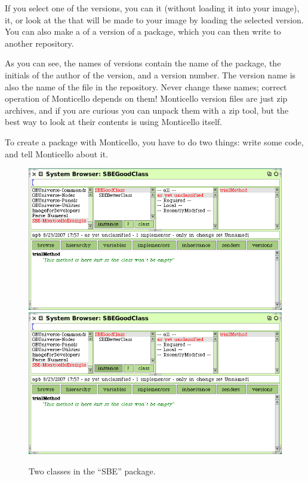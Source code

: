 \documentclass[a4paper,10pt,twoside]{book}
\begin{document}
If you select one of the versions, you can  it (without loading it into your image),  it, or look at the  that will be made to your image by loading the selected version.  You can also make a  of a version of a package, which you can then write to another repository.

As you can see, the names of versions contain the name of the package, the initials of the author of the version, and a version number.  The version name is also the name of the file in the repository.  Never change these names; correct operation of Monticello depends on them!   Monticello version files are just zip archives, and if you are curious you can unpack them with a zip tool, but the best way to look at their contents is using Monticello itself.  

To create a package with Monticello, you have to do two things: write some code, and tell Monticello about it.


\begin{figure}[btp]
	\begin{center}
	\ifluluelse
		{\includegraphics[width=\textwidth]{MCnewcategory}}
		{\includegraphics[scale=0.7]{MCnewcategory}}
	\end{center}
	\caption{Two classes in the ``SBE'' package.}
	\label{fig:MCnewcategory}
\end{figure}
\end{document}
